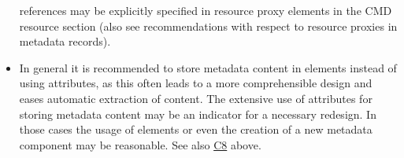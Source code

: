 \documentclass[]{article}
\begin{document}
\begin{itemize}
  references may be explicitly specified in resource proxy elements in
  the CMD resource section (also see recommendations with respect to
  resource proxies in metadata records).
\item
  In general it is recommended to store metadata content in elements
  instead of using attributes, as this often leads to a more
  comprehensible design and eases automatic extraction of content. The
  extensive use of attributes for storing metadata content may be an
  indicator for a necessary redesign. In those cases the usage of
  elements or even the creation of a new metadata component may be
  reasonable. See also
  \href{/modelling_component_metadata/components.md\#c8}{C8} above.
\end{itemize}
\end{document}
